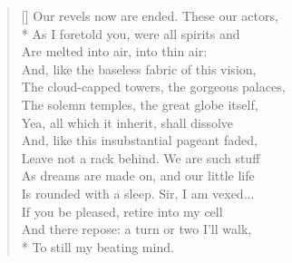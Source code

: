 \documentclass[MAIN]{subfiles}
\begin{document}
\settowidth{\versewidth}{Our revels now are ended. These our actors,}
\begin{verse}[\versewidth]
Our revels now are ended. These our actors,\\*
As I foretold you, were all spirits and\\
Are melted into air, into thin air:\\
And, like the baseless fabric of this vision,\\
The cloud-capped towers, the gorgeous palaces,\\
The solemn temples, the great globe itself,\\
Yea, all which it inherit, shall dissolve\\
And, like this insubstantial pageant faded,\\
Leave not a rack behind. We are such stuff\\
As dreams are made on, and our little life\\
Is rounded with a sleep. Sir, I am vexed...\\
If you be pleased, retire into my cell\\
And there repose: a turn or two I'll walk,\\*
To still my beating mind.
\end{verse}
\end{document}
